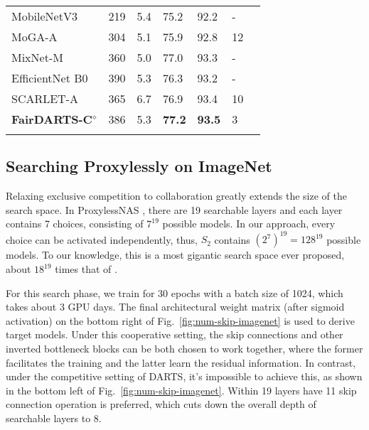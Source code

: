 \documentclass[runningheads]{llncs}
\begin{document}
\begin{table}
\begin{center}
\begin{footnotesize}
\begin{tabular}{*{7}{l}}
			\hline\noalign{\smallskip}
			MobileNetV3 \cite{howard2019searching} & 219 & 5.4 &75.2 & 92.2 & -\\
			MoGA-A \cite{chu2019moga} & 304 & 5.1 & 75.9 & 92.8 & 12 \\
			MixNet-M \cite{tan2020mixconv} &360 & 5.0 & 77.0 & 93.3& -\\
			EfficientNet B0 \cite{tan2019efficientnet} &390 & 5.3  & 76.3 & 93.2 & - \\
			SCARLET-A \cite{chu2019scarletnas} & 365 & 6.7 &   76.9 &93.4 & 10 \\
			\textbf{FairDARTS-C}$^\diamond$ & 386 & 5.3 & \textbf{77.2} & \textbf{93.5} & 3 \\


\hline\noalign{\smallskip}
		\end{tabular}
		\end{footnotesize}
	\end{center}
\end{table}\setlength{\tabcolsep}{1.4pt}

\subsection{Searching Proxylessly on ImageNet}{\label{sec:proxyless}}


Relaxing exclusive competition to collaboration greatly extends the size of the search space. In ProxylessNAS \cite{cai2018proxylessnas}, there are 19 searchable layers and each layer contains 7 choices, consisting of $7^{19}$ possible models. In our approach, every choice can be activated independently, thus, $S_2$ contains $({2^{7}})^{19}=128^{19}$ possible models. To our knowledge, this is a most gigantic search space ever proposed, about $18^{19}$ times that of \cite{cai2018proxylessnas}. 

For this search phase, we train for 30 epochs with a batch size of 1024, which takes about 3 GPU days. The final architectural weight matrix (after sigmoid activation) on the bottom right of Fig.~\ref{fig:num-skip-imagenet} is used to derive target models. Under this cooperative setting, the skip connections and other inverted bottleneck blocks can be both chosen to work together, where the former facilitates the training and the latter learn the residual information\cite{li2017convergence}. In contrast, under the competitive setting of DARTS, it's impossible to achieve this, as shown in the bottom left of Fig.~\ref{fig:num-skip-imagenet}. Within 19 layers have 11 skip connection operation is preferred, which cuts down the overall depth of searchable layers to 8.
\end{document}
